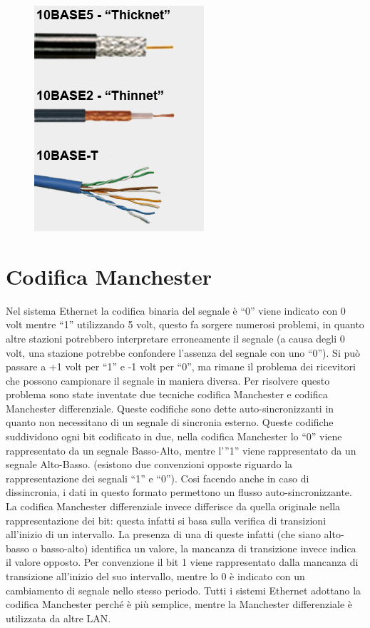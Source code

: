 \begin{figure}[H]
\centering
\includegraphics[scale=0.6]{res/img/27_CaviEthernet.png}
\end{figure}

\section{Codifica Manchester}

Nel sistema Ethernet la codifica binaria del segnale è “0” viene indicato con 0 volt mentre “1” utilizzando 5 volt, questo fa sorgere numerosi problemi, in quanto altre stazioni potrebbero interpretare erroneamente il segnale (a causa degli 0 volt, una stazione potrebbe confondere l’assenza del segnale con uno “0”). Si può passare a +1 volt per “1” e -1 volt per “0”, ma rimane il problema dei ricevitori che possono campionare il segnale in maniera diversa.
Per risolvere questo problema sono state inventate due tecniche codifica Manchester e codifica Manchester differenziale.
Queste codifiche sono dette auto-sincronizzanti in quanto non necessitano di un segnale di sincronia esterno.
Queste codifiche suddividono ogni bit codificato in due, nella codifica Manchester lo “0” viene rappresentato da un segnale Basso-Alto, mentre l’”1” viene rappresentato da un segnale Alto-Basso. (esistono due convenzioni opposte riguardo la rappresentazione dei segnali “1” e “0”).
Cosi facendo anche in caso di dissincronia, i dati in questo formato permettono un flusso auto-sincronizzante.
La codifica Manchester differenziale invece differisce da quella originale nella rappresentazione dei bit: questa infatti si basa sulla verifica di transizioni all’inizio di un intervallo. La presenza di una di queste infatti (che siano alto-basso o basso-alto) identifica un valore, la mancanza di transizione invece indica il valore opposto. Per convenzione il bit 1 viene rappresentato dalla mancanza di transizione all’inizio del suo intervallo, mentre lo 0 è indicato con un cambiamento di segnale nello stesso periodo.
Tutti i sistemi Ethernet adottano la codifica Manchester perché è più semplice, mentre la Manchester differenziale è utilizzata da altre LAN.

